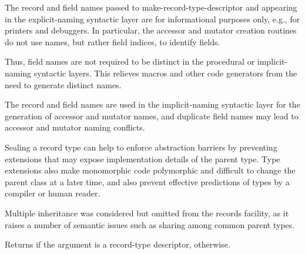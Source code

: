 \begin{entry}{%
}
\begin{rationale}
  The record and field names passed to
  {\cf make-record-type-descriptor} and appearing in the explicit-naming
  syntactic layer are for informational purposes only, e.g., for
  printers and debuggers.
  In particular, the accessor and mutator creation routines do not use
  names, but rather field indices, to identify fields.
  
  Thus, field names are not required to be distinct in the procedural or
  implicit-naming syntactic layers.
  This relieves macros and other code generators from the need to
  generate distinct names.

  The record and field names are used in the implicit-naming syntactic
  layer for the generation of accessor and mutator names, and duplicate
  field names may lead to accessor and mutator naming conflicts.
\end{rationale}

\begin{rationale}
  Sealing a record type can help to enforce abstraction barriers by preventing
  extensions that may expose implementation details of the parent type.
  Type extensions also make monomorphic code polymorphic and
  difficult to change the parent class at a later time, and also
  prevent effective predictions of types by a compiler or human
  reader.
\end{rationale}

\begin{rationale}
  Multiple inheritance was considered but omitted from the records
  facility, as it raises a number of semantic issues such as
  sharing among common parent types.
\end{rationale}
\end{entry}

\begin{entry}{%
}
   
Returns \schtrue{} if the argument is a record-type descriptor,
\schfalse{} otherwise.
\end{entry}

